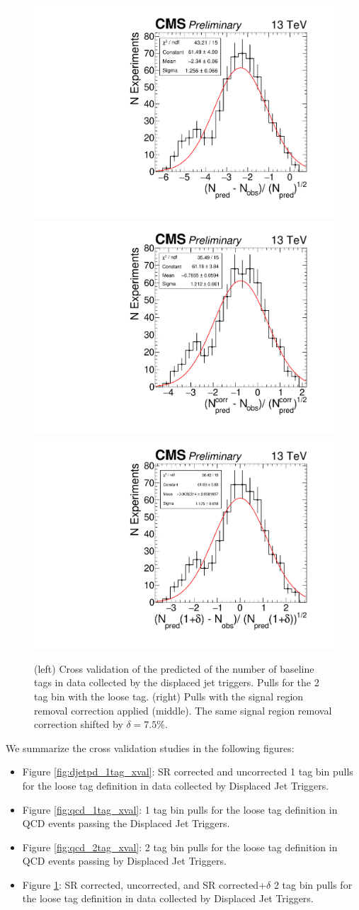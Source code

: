 \begin{figure}
\begin{center}
\includegraphics[width=.31\textwidth]{figures/an/ANALYSIS/pulls/data_loose_uncorrected_2tag.pdf}
\includegraphics[width=.31\textwidth]{figures/an/ANALYSIS/pulls/data_loose_corrected_2tag.pdf}
\includegraphics[width=.31\textwidth]{figures/an/ANALYSIS/pulls/data_loose_corrected_delta0p075_2tag.pdf}
\caption{(left) Cross validation of the predicted of the number of baseline tags in data collected by the displaced jet triggers. Pulls for the 2 tag bin with the loose tag. (right) Pulls with the signal region removal correction applied (middle). The same signal region removal correction shifted by $\delta=7.5\%$. 
\label{fig:djetpd_2tag_xval}}
\end{center}
\end{figure}

We summarize the cross validation studies in the following figures:
\begin{itemize}
\item Figure \ref{fig:djetpd_1tag_xval}: SR corrected and uncorrected 1 tag bin pulls for the loose tag definition in data collected by Displaced Jet Triggers. 
\item Figure \ref{fig:qcd_1tag_xval}: 1 tag bin pulls for the loose tag definition in QCD events passing the Displaced Jet Triggers. 
\item Figure \ref{fig:qcd_2tag_xval}: 2 tag bin pulls for the loose tag definition in QCD events passing by Displaced Jet Triggers. 
\item Figure \ref{fig:djetpd_2tag_xval}: SR corrected, uncorrected, and SR corrected+$\delta$ 2 tag bin pulls for the loose tag definition in data collected by Displaced Jet Triggers.
\end{itemize}

